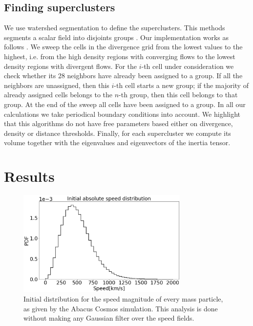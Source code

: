 \documentclass[usenatbib]{mnras}
\begin{document}
\subsection{Finding superclusters}
\label{sec:INTROWatershed}

We use watershed segmentation to define the superclusters.
This methods segments a scalar field into disjoints groups \citep{BeucherWatershed1979, BeucherSegmetation}.
Our implementation works as follows . 
We sweep the cells in the divergence grid from the lowest values to the highest, i.e. from
the high density regions with converging flows to the lowest density regions with divergent
flows.
For the $i$-th cell under consideration we check whether its 28 neighbors have already been assigned to a group. 
If all the neighbors are unassigned, then this $i$-th cell starts a new group; if the majority of already assigned cells belongs to the $n$-th group, then this cell belongs to that group. 
At the end of the sweep all cells have been assigned to a group.
In all our calculations we take periodical boundary conditions into account. 
We highlight that this algorithms do not have free parameters based either on divergence, density or distance thresholds.
Finally, for each supercluster we compute its volume together with the eigenvalues and eigenvectors of the inertia tensor.


\section{Results}




\begin{figure}
    \centering
    \includegraphics[width=240pt]{initial_distribution.pdf}
    \caption{Initial distribution for the speed magnitude of every mass particle, as given by the Abacus Cosmos simulation. This analysis is done without making any Gaussian filter over the speed fields.}
    \label{fig:initial_distribution}
\end{figure}
\end{document}

